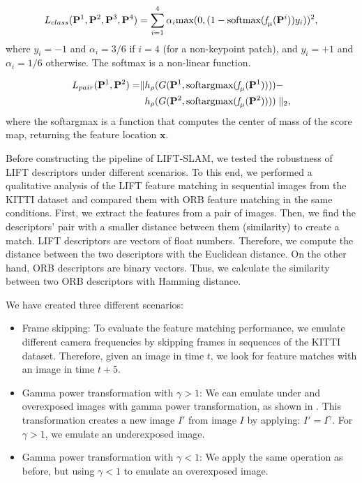 \begin{equation}
    L_{class}(\mathbf{P}^{1}, \mathbf{P}^{2}, \mathbf{P}^{3}, \mathbf{P}^{4}) = \sum_{i=1}^{4} \alpha_{i} \textrm{max}(0, (1-\textrm{softmax}(\emph{f}_{\mu}(\mathbf{P}^i))y_{i}))^2,
\label{eq:loss-class}
\end{equation}
where $y_i = -1$ and $\alpha_i = 3/6$ if $i=4$ (for a non-keypoint patch), and $y_i = +1$ and $\alpha_i = 1/6$ otherwise. The \textrm{softmax} is a non-linear function.

\begin{equation}
\begin{split}
     L_{pair}(\mathbf{P}^{1}, \mathbf{P}^{2}) = \parallel &h_{\rho}(G(\mathbf{P}^{1}, \textrm{softargmax}(\emph{f}_{\mu}(\mathbf{P}^1)))) - \\& h_{\rho}(G(\mathbf{P}^{2}, \textrm{softargmax}(\emph{f}_{\mu}(\mathbf{P}^2))))\parallel_2,
\end{split}
\label{eq:loss-pair}
\end{equation}
where the \textrm{softargmax} is a function that computes the center of mass of the score map, returning the feature location $\mathbf{x}$.

Before constructing the pipeline of LIFT-SLAM, we tested the robustness of LIFT descriptors under different scenarios. To this end, we performed a qualitative analysis of the LIFT feature matching in sequential images from the KITTI dataset and compared them with ORB feature matching in the same conditions. First, we extract the features from a pair of images. Then, we find the descriptors' pair with a smaller distance between them (similarity) to create a match. LIFT descriptors are vectors of float numbers. Therefore, we compute the distance between the two descriptors with the Euclidean distance. On the other hand, ORB descriptors are binary vectors. Thus, we calculate the similarity between two ORB descriptors with Hamming distance.

We have created three different scenarios:
\begin{itemize}
    \item Frame skipping: To evaluate the feature matching performance, we emulate different camera frequencies by skipping frames in sequences of the KITTI dataset. Therefore, given an image in time $t$, we look for feature matches with an image in time $t+5$.
    
    \item Gamma power transformation with $\gamma > 1$: We can emulate under and overexposed images with gamma power transformation, as shown in \cite{emulate-exposure}. This transformation creates a new image $I'$ from image $I$ by applying: $I'=I^{\gamma}$. For $\gamma > 1$, we emulate an underexposed image.
    
    \item Gamma power transformation with $\gamma < 1$: We apply the same operation as before, but using $\gamma < 1$ to emulate an overexposed image.
\end{itemize}

